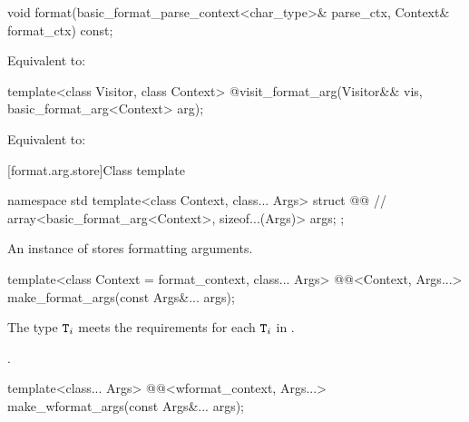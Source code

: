 %
\begin{itemdecl}
void format(basic_format_parse_context<char_type>& parse_ctx, Context& format_ctx) const;
\end{itemdecl}

\begin{itemdescr}
\pnum
\effects
Equivalent to: 
\end{itemdescr}

%
\begin{itemdecl}
template<class Visitor, class Context>
  @\seebelow@ visit_format_arg(Visitor&& vis, basic_format_arg<Context> arg);
\end{itemdecl}

\begin{itemdescr}
\pnum
\effects
Equivalent to: 
\end{itemdescr}

[format.arg.store]{Class template }

\begin{codeblock}
namespace std {
  template<class Context, class... Args>
  struct @@ {      // \expos
    array<basic_format_arg<Context>, sizeof...(Args)> args;
  };
}
\end{codeblock}

\pnum
An instance of  stores formatting arguments.

%
\begin{itemdecl}
template<class Context = format_context, class... Args>
  @@<Context, Args...> make_format_args(const Args&... args);
\end{itemdecl}

\begin{itemdescr}
\pnum
\expects
The type
$\texttt{T}_i$\tcode{>}
meets the  requirements
for each $\texttt{T}_i$ in .

\pnum
\returns
{}.
\end{itemdescr}

%
\begin{itemdecl}
template<class... Args>
  @@<wformat_context, Args...> make_wformat_args(const Args&... args);
\end{itemdecl}

